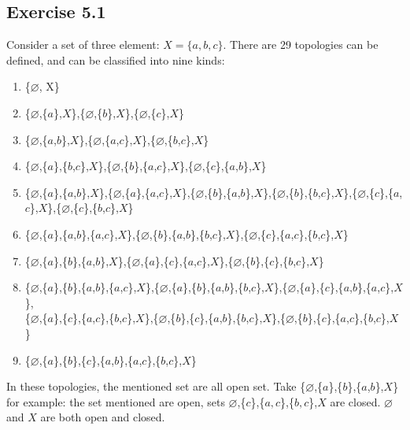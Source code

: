 \documentclass[]{ctexart}
\begin{document}
	\subsection{Exercise 5.1}
		Consider a set of three element: $X=\{a,b,c\}$. There are 29 topologies can be defined, and can be classified into nine kinds:
			\begin{enumerate}
				\item \{$\varnothing$, X\}
				\item \{$\varnothing$,\{$a$\},$X$\},\{$\varnothing$,\{$b$\},$X$\},\{$\varnothing$,\{$c$\},$X$\}
				\item \{$\varnothing$,\{$a$,$b$\},$X$\},\{$\varnothing$,\{$a$,$c$\},$X$\},\{$\varnothing$,\{$b$,$c$\},$X$\}
				\item \{$\varnothing$,\{$a$\},\{$b$,$c$\},$X$\},\{$\varnothing$,\{$b$\},\{$a$,$c$\},$X$\},\{$\varnothing$,\{$c$\},\{$a$,$b$\},$X$\}
				\item \{$\varnothing$,\{$a$\},\{$a$,$b$\},$X$\},\{$\varnothing$,\{$a$\},\{$a$,$c$\},$X$\},\{$\varnothing$,\{$b$\},\{$a$,$b$\},$X$\},\{$\varnothing$,\{$b$\},\{$b$,$c$\},$X$\},\{$\varnothing$,\{$c$\},\{$a$,$c$\},$X$\},\{$\varnothing$,\{$c$\},\{$b$,$c$\},$X$\}
				\item \{$\varnothing$,\{$a$\},\{$a$,$b$\},\{$a$,$c$\},$X$\},\{$\varnothing$,\{$b$\},\{$a$,$b$\},\{$b$,$c$\},$X$\},\{$\varnothing$,\{$c$\},\{$a$,$c$\},\{$b$,$c$\},$X$\}
				\item \{$\varnothing$,\{$a$\},\{$b$\},\{$a$,$b$\},$X$\},\{$\varnothing$,\{$a$\},\{$c$\},\{$a$,$c$\},$X$\},\{$\varnothing$,\{$b$\},\{$c$\},\{$b$,$c$\},$X$\}
				\item \{$\varnothing$,\{$a$\},\{$b$\},\{$a$,$b$\},\{$a$,$c$\},$X$\},\{$\varnothing$,\{$a$\},\{$b$\},\{$a$,$b$\},\{$b$,$c$\},$X$\},\{$\varnothing$,\{$a$\},\{$c$\},\{$a$,$b$\},\{$a$,$c$\},$X$\},\\\{$\varnothing$,\{$a$\},\{$c$\},\{$a$,$c$\},\{$b$,$c$\},$X$\},\{$\varnothing$,\{$b$\},\{$c$\},\{$a$,$b$\},\{$b$,$c$\},$X$\},\{$\varnothing$,\{$b$\},\{$c$\},\{$a$,$c$\},\{$b$,$c$\},$X$\}
				\item \{$\varnothing$,\{$a$\},\{$b$\},\{$c$\},\{$a$,$b$\},\{$a$,$c$\},\{$b$,$c$\},$X$\}
			\end{enumerate}
		
		In these topologies, the  mentioned set are all open set. Take \{$\varnothing$,\{$a$\},\{$b$\},\{$a$,$b$\},$X$\} for example: the set mentioned are open, sets $\varnothing$,\{$ c $\},\{$ a,c $\},\{$ b,c $\},$X$ are closed. $\varnothing$ and $X$ are both open and closed.
\end{document}
